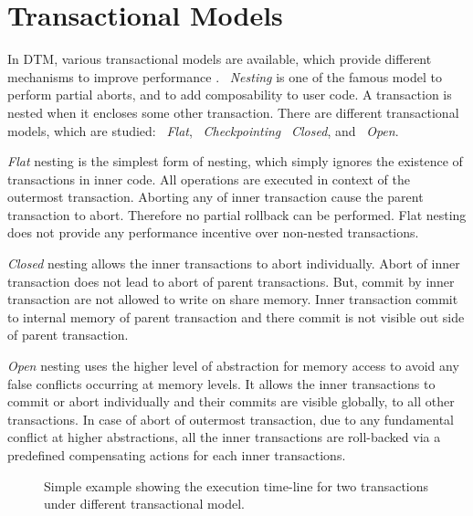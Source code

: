 \documentclass[12pt,english]{report}
\begin{document}
\section{Transactional Models}

In DTM, various transactional models are available, which provide different mechanisms to improve performance . ~\emph{Nesting} is one of the famous model to perform partial aborts, and to add composability to user code. A transaction is nested when it encloses some other transaction. There are different transactional  models, which are studied: ~\emph{Flat}, ~\emph{Checkpointing} ~\emph{Closed}, and ~\emph{Open}. 

\textit{Flat} nesting is the simplest form of nesting, which simply ignores the existence of transactions in inner code. All operations are executed in context of the outermost transaction. Aborting any of inner transaction cause the parent transaction to abort. Therefore no partial rollback can be performed. Flat nesting does not provide any performance incentive over non-nested transactions.

\textit{Closed} nesting allows the inner transactions to abort individually. Abort of inner transaction does not lead to abort of parent transactions. But, commit by inner transaction are not allowed to write on share memory. Inner transaction commit to internal memory of parent transaction and there commit is not visible out side of parent transaction.

\textit{Open} nesting uses the higher level of abstraction for memory access to avoid any false conflicts occurring at memory levels. It allows the inner transactions to commit or abort individually and their commits are visible globally, to all other transactions. In case of abort of outermost transaction, due to any fundamental conflict at higher abstractions, all the inner transactions are roll-backed via a predefined compensating actions for each inner transactions.

\begin{figure}
\caption{Simple example showing the execution time-line for two transactions under different transactional model.}
\label{Fig:Nesting_example}
\end{figure}
\end{document}

